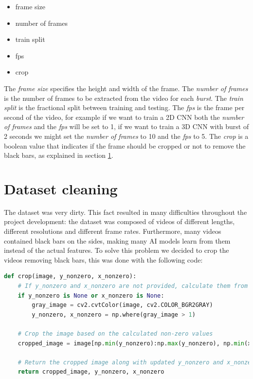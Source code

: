 \begin{itemize}
	\item frame size
	\item number of frames
	\item train split
	\item fps
	\item crop
\end{itemize}
The \textit{frame size} specifies the height and width of the frame. The \textit{number of frames} is the number of frames to be extracted from the video for each \textit{burst}. The \textit{train split} is the fractional split between training and testing. The \textit{fps} is the frame per second of the video, for example if we want to train a 2D CNN both the \textit{number of frames} and the \textit{fps} will be set to 1, if we want to train a 3D CNN with burst of 2 seconds we might set the \textit{number of frames} to 10 and the \textit{fps} to 5. The \textit{crop} is a boolean value that indicates if the frame should be cropped or not to remove the black bars, as explained in section \ref{sec:datasetcleaning}.

\section{Dataset cleaning}
\label{sec:datasetcleaning}
The dataset was very dirty. This fact resulted in many difficulties throughout the project development: the dataset was composed of videos of different lengths, different resolutions and different frame rates. Furthermore, many videos contained black bars on the sides, making many AI models learn from them instead of the actual features. To solve this problem we decided to crop the videos removing black bars, this was done with the following code:

\begin{lstlisting}[language=Python, caption={Image Cropper}, label={lst:ImageCropper}]
def crop(image, y_nonzero, x_nonzero):
    # If y_nonzero and x_nonzero are not provided, calculate them from the grayscale version of the image
    if y_nonzero is None or x_nonzero is None:
        gray_image = cv2.cvtColor(image, cv2.COLOR_BGR2GRAY)
        y_nonzero, x_nonzero = np.where(gray_image > 1)

    # Crop the image based on the calculated non-zero values
    cropped_image = image[np.min(y_nonzero):np.max(y_nonzero), np.min(x_nonzero):np.max(x_nonzero)]

    # Return the cropped image along with updated y_nonzero and x_nonzero values
    return cropped_image, y_nonzero, x_nonzero
\end{lstlisting}

